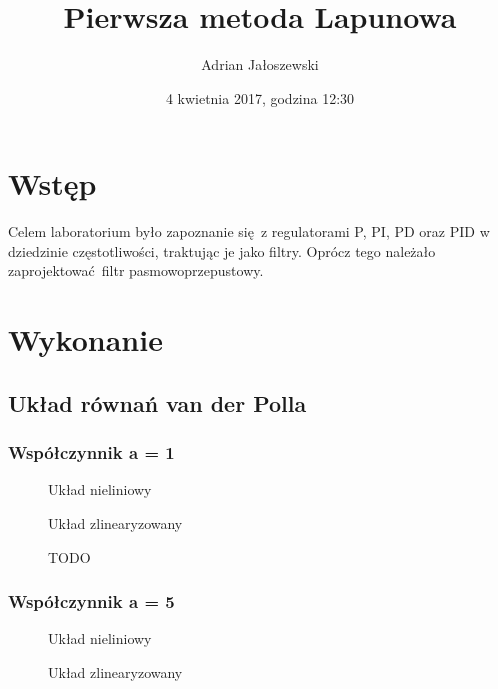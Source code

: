 \documentclass[a4paper, 10pt]{article}
\title{Pierwsza metoda Lapunowa}
\author{Adrian Jałoszewski}
\date{4 kwietnia 2017, godzina 12:30}
\begin{document}
	\maketitle
	\tableofcontents
	\section{Wstęp}
		Celem laboratorium było zapoznanie się z regulatorami P, PI, PD oraz PID w dziedzinie częstotliwości, traktując je jako filtry. Oprócz tego należało zaprojektować filtr pasmowoprzepustowy.
	\section{Wykonanie}
		\subsection{Układ równań van der Polla}
			\subsubsection{Współczynnik a = 1}
				\begin{figure}[H]
					\centering
					\def \svgwidth{0.75\columnwidth}
					
					\caption{Układ nieliniowy}
				\end{figure}\noindent
				
				
				\begin{figure}[H]
					\centering
					\def \svgwidth{0.75\columnwidth}
					
					\caption{Układ zlinearyzowany}
				\end{figure}\noindent
				
				\begin{figure}[H]
					\centering
					\def \svgwidth{0.75\columnwidth}
					
					\caption{TODO}
				\end{figure}\noindent
			
			\subsubsection{Współczynnik a = 5}
				\begin{figure}[H]
					\centering
					\def \svgwidth{0.75\columnwidth}
					
					\caption{Układ nieliniowy}
				\end{figure}\noindent
				
				
				\begin{figure}[H]
					\centering
					\def \svgwidth{0.75\columnwidth}
					
					\caption{Układ zlinearyzowany}
				\end{figure}\noindent
				
\end{document}
